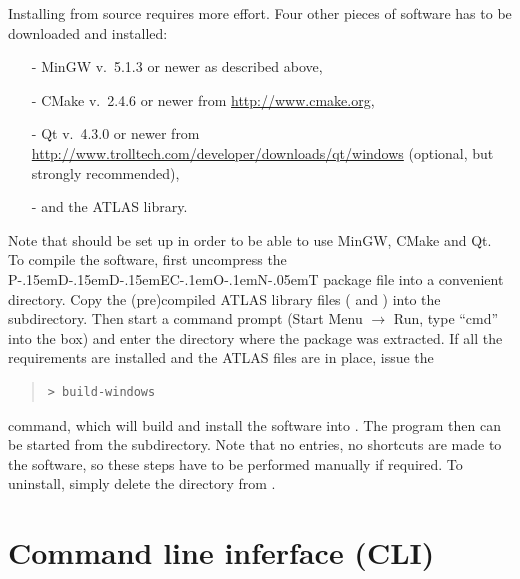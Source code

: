 \documentclass[10pt,a4paper]{ddedoc}
\def\knut{{P\kern-.15emD\kern-.15emD\kern-.15emE\raisebox{.25ex}{-}C\kern-.1emO\kern-.1emN\kern-.05emT}}
\begin{document}
Installing from source requires more effort. Four other pieces of software has
to be downloaded and installed:
\begin{itemize}
\item[-] MinGW v.\ 5.1.3 or newer as described above,
\item[-] CMake v.\ 2.4.6 or newer from \url{http://www.cmake.org},
\item[-] Qt v.\ 4.3.0 or newer from
\url{http://www.trolltech.com/developer/downloads/qt/windows} (optional, but strongly recommended),
\item[-] and the ATLAS library.
\end{itemize}
Note that  should be set up in order to be able to use MinGW, CMake and Qt. 
To compile the software, first uncompress the \knut{} package file
 into a convenient directory.
Copy the (pre)compiled ATLAS library files ( and
) into the  subdirectory.
Then start a command prompt (Start Menu $\rightarrow$ Run, type ``cmd'' into the
box) and enter the directory  where the package was
extracted. If all the requirements are installed and the ATLAS files are in
place, issue the
{ \small \begin{quote} \begin{lstlisting}[basicstyle=\tt,frame=single]
 > build-windows
\end{lstlisting} \end{quote} } \noindent
command, which will build and install the software into . The program then can be started from the 
subdirectory. Note that no  entries, no shortcuts are made to
the software, so these steps have to be performed manually if required. To
uninstall, simply delete the  directory from .

\section{Command line inferface (CLI)}
\end{document}
